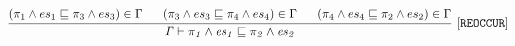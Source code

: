  \begin{gather*}
\frac{
\begin{matrix}
\text{\codeme{ (\pi_1 \wedge \es_1 \CONTAIN \pi_3 \wedge \es_3) \in \Gamma  }} 
\quad\ \ 
\text{\codeme{(\pi_3 \wedge \es_3 \CONTAIN  \pi_4 \wedge \es_4) \in {\Gamma} }} \quad\  \ 
\text{\codeme{ (\pi_4 \wedge \es_4 \CONTAIN \pi_2 \wedge \es_2) \in {\Gamma}  }}
\end{matrix}
}{\text{\code{\Gamma  \vdash  \pi_1 \wedge \es_1 \CONTAIN  \pi_2 \wedge \es_2 }} }
\ \codeme{[REOCCUR]}
\end{gather*}